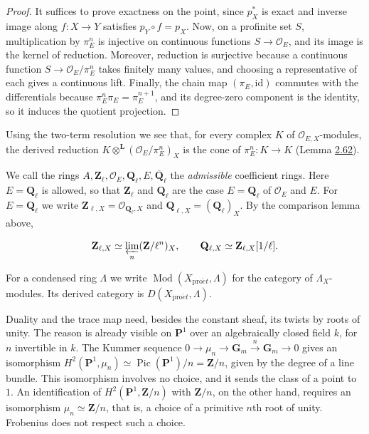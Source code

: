 \documentclass[11pt]{article}
\begin{document}
\begin{proof}[{Proof}]\label{bp160}%
It suffices to prove exactness on the point, since \(p_X^*\) is exact and inverse image along \(f:X\to Y\) satisfies \(p_Y\circ f=p_X\). Now, on a profinite set \(S\), multiplication by \(\pi_E^n\) is injective on continuous functions \(S\to\mathcal O_E\), and its image is the kernel of reduction. Moreover, reduction is surjective because a continuous function \(S\to\mathcal O_E/\pi_E^n\) takes finitely many values, and choosing a representative of each gives a continuous lift. Finally, the chain map \((\pi_E,\mathrm{id})\) commutes with the differentials because \(\pi_E^{n}\pi_E=\pi_E^{n+1}\), and its degree-zero component is the identity, so it induces the quotient projection.
\end{proof}

\label{bp161}%
Using the two-term resolution we see that, for every complex \(K\) of \(\mathcal O_{E,X}\)-modules, the derived reduction \(K\otimes^{\mathbf L}(\mathcal O_E/\pi_E^n)_X\) is the cone of \(\pi_E^n:K\to K\) (Lemma \hyperref[bp188]{2.62}).

We call the rings \(A,\mathbf Z_\ell,\mathcal O_E,\mathbf Q_\ell,E,\overline{\mathbf Q}_\ell\) the \emph{admissible} coefficient rings. Here \(E=\mathbf Q_\ell\) is allowed, so that \(\mathbf Z_\ell\) and \(\mathbf Q_\ell\) are the case \(E=\mathbf Q_\ell\) of \(\mathcal O_E\) and \(E\). For \(E=\mathbf Q_\ell\) we write \(\mathbf Z_{\ell,X}=\mathcal O_{\mathbf Q_\ell,X}\) and \(\mathbf Q_{\ell,X}=(\mathbf Q_\ell)_X\). By the comparison lemma above,

\[
\mathbf Z_{\ell,X}\simeq\varprojlim_n(\mathbf Z/\ell^n)_X,
\qquad
\mathbf Q_{\ell,X}\simeq\mathbf Z_{\ell,X}[1/\ell].
\]

For a condensed ring \(\Lambda\) we write \(\operatorname{Mod}(X_{\mathrm{pro}\acute{e}t},\Lambda)\) for the category of \(\Lambda_X\)-modules. Its derived category is \(D(X_{\mathrm{pro}\acute{e}t},\Lambda)\).

Duality and the trace map need, besides the constant sheaf, its twists by roots of unity. The reason is already visible on \(\mathbf P^1\) over an algebraically closed field \(k\), for \(n\) invertible in \(k\). The Kummer sequence \(0\to\mu_n\to\mathbf G_m\xrightarrow{n}\mathbf G_m\to0\) gives an isomorphism \(H^2(\mathbf P^1,\mu_n)\simeq\operatorname{Pic}(\mathbf P^1)/n=\mathbf Z/n\), given by the degree of a line bundle. This isomorphism involves no choice, and it sends the class of a point to \(1\). An identification of \(H^2(\mathbf P^1,\mathbf Z/n)\) with \(\mathbf Z/n\), on the other hand, requires an isomorphism \(\mu_n\simeq\mathbf Z/n\), that is, a choice of a primitive \(n\)th root of unity. Frobenius does not respect such a choice.
\end{document}
